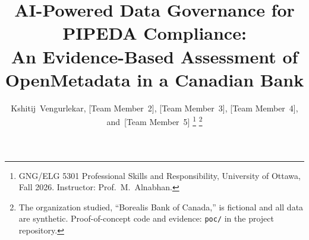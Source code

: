 \documentclass[journal,onecolumn,11pt]{IEEEtran}
\begin{document}
\title{AI-Powered Data Governance for PIPEDA Compliance:\\
An Evidence-Based Assessment of OpenMetadata in a Canadian Bank}

\author{Kshitij~Vengurlekar, [Team Member~2], [Team Member~3], [Team Member~4], and~[Team Member~5]%
\thanks{GNG/ELG 5301 Professional Skills and Responsibility, University of Ottawa, Fall 2026. Instructor: Prof.\ M.\ Alnabhan.}%
\thanks{The organization studied, ``Borealis Bank of Canada,'' is fictional and all data are synthetic. Proof-of-concept code and evidence: \texttt{poc/} in the project repository.}}


\maketitle
\end{document}
